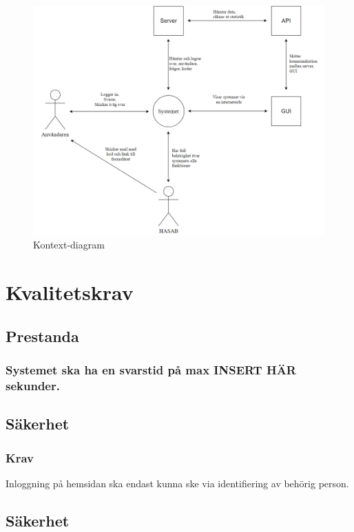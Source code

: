 \documentclass{article}
\begin{document}
    \begin{figure}[h!]
    \caption{Kontext-diagram}
    \includegraphics[width=150mm]{Kontextdiagram.png}
    
    \end{figure}
    
    \section{Kvalitetskrav}
    \subsection{Prestanda}
    \subsubsection{Systemet ska ha en svarstid på max INSERT HÄR sekunder.}
    

    \subsection{Säkerhet}
    \subsubsection{Krav}
    Inloggning på hemsidan ska endast kunna ske via identifiering av behörig person.
    
    \subsection{Säkerhet}
    
\end{document}
